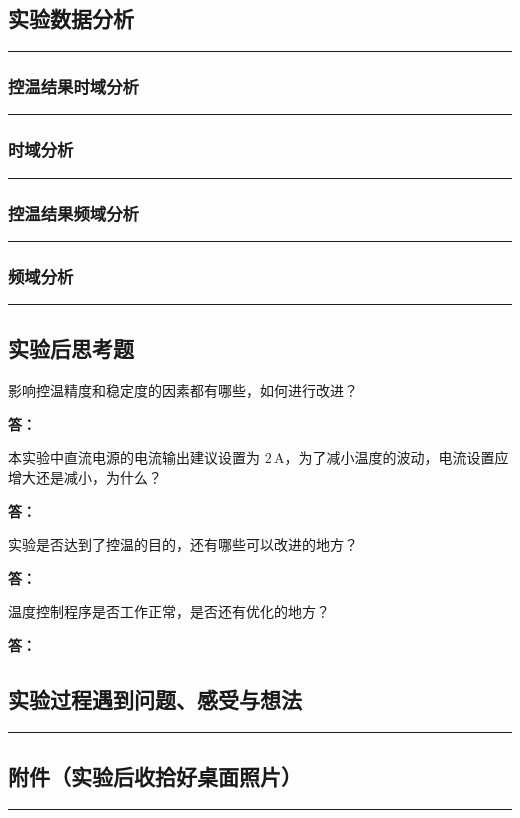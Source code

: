 \documentclass[dvipsnames, svgnames,a4paper,11pt]{article}
\newcommand{\answerblank}[1][3.8cm]{%
  \par\nopagebreak[4]\noindent\textbf{答：}\par\nopagebreak[4]\vspace*{#1}}
\newcommand{\recordblank}[1]{%
  \par\noindent\rule{0.95\linewidth}{0pt}\rule{0pt}{#1}\par}
\begin{document}
\subsection{实验数据分析}
\recordblank{3.2cm}
\subsubsection{控温结果时域分析}
\recordblank{3.2cm}
\subsubsection{时域分析}
\recordblank{3.2cm}
\subsubsection{控温结果频域分析}
\recordblank{3.2cm}
\subsubsection{频域分析}
\recordblank{3.2cm}
\subsection{实验后思考题}

\begin{question}
	影响控温精度和稳定度的因素都有哪些，如何进行改进？
\end{question}
\answerblank[3.8cm]

\begin{question}
	本实验中直流电源的电流输出建议设置为 $2\,\mathrm{A}$，为了减小温度的波动，电流设置应增大还是减小，为什么？
\end{question}
\answerblank[3.8cm]

\begin{question}
	实验是否达到了控温的目的，还有哪些可以改进的地方？
\end{question}
\answerblank[3.8cm]

\begin{question}
	温度控制程序是否工作正常，是否还有优化的地方？
\end{question}
\answerblank[3.8cm]

\subsection{实验过程遇到问题、感受与想法}
\recordblank{5cm}
\clearpage
\appendix
\appendixpage
\addappheadtotoc
\subsection{附件（实验后收拾好桌面照片）}
\recordblank{5.5cm}
\end{document}
